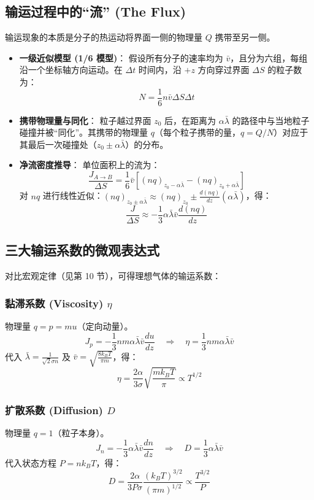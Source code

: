 \documentclass{article}
\begin{document}
\subsection{输运过程中的“流” (The Flux)}
输运现象的本质是分子的热运动将界面一侧的物理量 $Q$ 携带至另一侧。
\begin{itemize}
    \item \textbf{一级近似模型 (1/6 模型)}：
    假设所有分子的速率均为 $\bar{v}$，且分为六组，每组沿一个坐标轴方向运动。在 $\Delta t$ 时间内，沿 $+z$ 方向穿过界面 $\Delta S$ 的粒子数为：
    \[ N = \frac{1}{6} n \bar{v} \Delta S \Delta t \]
    \item \textbf{携带物理量与同化}：
    粒子越过界面 $z_0$ 后，在距离为 $\alpha \bar{\lambda}$ 的路径中与当地粒子碰撞并被“同化”。其携带的物理量 $q$（每个粒子携带的量，$q = Q/N$）对应于其最后一次碰撞处（$z_0 \pm \alpha \bar{\lambda}$）的分布。
    \item \textbf{净流密度推导}：
    单位面积上的流为：
    \[ \frac{J_{A \to B}}{\Delta S} = \frac{1}{6} \bar{v} \left[ (nq)_{z_0 - \alpha\bar{\lambda}} - (nq)_{z_0 + \alpha\bar{\lambda}} \right] \]
    对 $nq$ 进行线性近似：$(nq)_{z_0 \pm \alpha\bar{\lambda}} \approx (nq)_{z_0} \pm \frac{d(nq)}{dz} (\alpha\bar{\lambda})$，得：
    \[ \frac{J}{\Delta S} \approx - \frac{1}{3} \alpha \bar{\lambda} \bar{v} \frac{d(nq)}{dz} \]
\end{itemize}

\subsection{三大输运系数的微观表达式}
对比宏观定律（见第 10 节），可得理想气体的输运系数：

\subsubsection{黏滞系数 (Viscosity) $\eta$}
物理量 $q = p = m u$（定向动量）。
\[ J_p = - \frac{1}{3} nm \alpha \bar{\lambda} \bar{v} \frac{du}{dz} \quad \Rightarrow \quad \eta = \frac{1}{3} nm \alpha \bar{\lambda} \bar{v} \]
代入 $\bar{\lambda} = \frac{1}{\sqrt{2} \sigma n}$ 及 $\bar{v} = \sqrt{\frac{8k_B T}{\pi m}}$，得：
\[ \eta = \frac{2\alpha}{3\sigma} \sqrt{\frac{m k_B T}{\pi}} \propto T^{1/2} \]

\subsubsection{扩散系数 (Diffusion) $D$}
物理量 $q = 1$（粒子本身）。
\[ J_n = - \frac{1}{3} \alpha \bar{\lambda} \bar{v} \frac{dn}{dz} \quad \Rightarrow \quad D = \frac{1}{3} \alpha \bar{\lambda} \bar{v} \]
代入状态方程 $P = nk_B T$，得：
\[ D = \frac{2\alpha}{3 P \sigma} \frac{(k_B T)^{3/2}}{(\pi m)^{1/2}} \propto \frac{T^{3/2}}{P} \]
\end{document}
